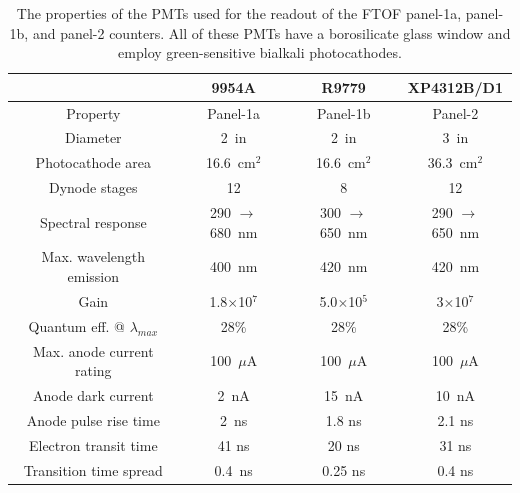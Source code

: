 \documentclass{elsart}
\begin{document}
\begin{table}[htbp]
\begin{center}
\begin{tabular}{c|c|c|c} \hline
                                                           & 9954A                    & R9779                     & XP4312B/D1 \\ \hline
Property                                            & Panel-1a                   & Panel-1b                  & Panel-2 \\ \hline
Diameter                                           & 2~in                         & 2~in                        & 3~in \\ \hline
Photocathode area                            & 16.6~cm$^2$           & 16.6~cm$^2$        & 36.3~cm$^2$ \\ \hline
Dynode stages                                  & 12                            & 8                              & 12 \\ \hline
Spectral response                            & 290 $\to$ 680~nm & 300 $\to$ 650~nm & 290 $\to$ 650~nm \\ \hline
Max. wavelength emission               & 400~nm & 420~nm & 420~nm \\ \hline
Gain                                                    & 1.8$\times$10$^7$ & 5.0$\times$10$^5$ & 3$\times$10$^7$ \\ \hline
Quantum eff. @ $\lambda_{max}$   & 28\% & 28\% & 28\% \\ \hline
Max. anode current rating               & 100~$\mu$A & 100~$\mu$A & 100~$\mu$A \\ \hline
Anode dark current                         & 2~nA & 15~nA & 10~nA \\ \hline
Anode pulse rise time                      & 2~ns & 1.8 ns & 2.1 ns \\ \hline
Electron transit time                        & 41 ns & 20 ns & 31 ns \\ \hline
Transition time spread                     & 0.4~ns & 0.25 ns & 0.4 ns \\ \hline
\end{tabular}
\end{center}
\caption{The properties of the PMTs used for the readout of the FTOF panel-1a, panel-1b, and panel-2
counters. All of these PMTs have a borosilicate glass window and employ green-sensitive bialkali photocathodes.}
\label{pmt-specs}
\end{table}
\end{document}
